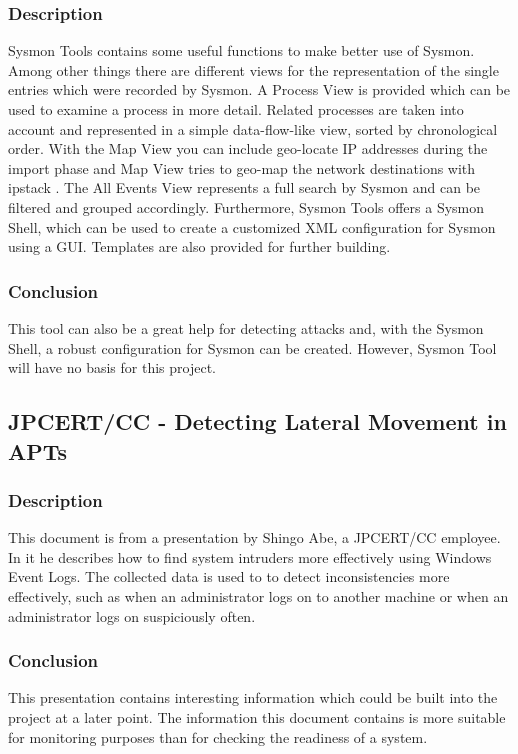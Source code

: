 \subsubsection{Description}
Sysmon Tools \cite{SysmonTools} contains some useful functions to make better use of Sysmon. Among other things there are different views for the representation of the single entries which were recorded by Sysmon. A Process View is provided which can be used to examine a process in more detail. Related processes are taken into account and represented in a simple data-flow-like view, sorted by chronological order. With the Map View you can include geo-locate IP addresses during the import phase and Map View tries to geo-map the network destinations with ipstack \cite{ipstack}. The All Events View represents a full search by Sysmon and can be filtered and grouped accordingly. Furthermore, Sysmon Tools offers a Sysmon Shell, which can be used to create a customized XML configuration for Sysmon using a GUI. Templates are also provided for further building.
\subsubsection{Conclusion}
This tool can also be a great help for detecting attacks and, with the Sysmon Shell, a robust configuration for Sysmon can be created. However, Sysmon Tool will have no basis for this project.

\subsection{JPCERT/CC - Detecting Lateral Movement in APTs} \label{DetectingLateral}
\subsubsection{Description}
This document \cite{Abe2016} is from a presentation by Shingo Abe, a JPCERT/CC employee. In it he describes how to find system intruders more effectively using Windows Event Logs. The collected data is used to to detect inconsistencies more effectively, such as when an administrator logs on to another machine or when an administrator logs on suspiciously often. 
\subsubsection{Conclusion}
This presentation contains interesting information which could be built into the project at a later point. The information this document contains is more suitable for monitoring purposes than for checking the readiness of a system.

